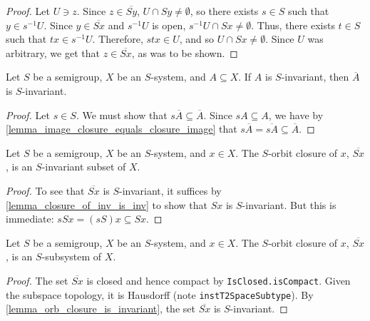 \begin{proof}
\leanok{}
    Let $U \ni z$.  Since $z \in \overline{Sy}$, $U \cap Sy \neq \emptyset$, so there exists $s \in S$ such that $y \in s^{-1}U$.  Since $y \in \overline{Sx}$ and $s^{-1}U$ is open, $s^{-1} U \cap Sx \neq \emptyset$.  Thus, there exists $t \in S$ such that $tx \in s^{-1} U$.  Therefore, $stx \in U$, and so $U \cap Sx \neq \emptyset$.  Since $U$ was arbitrary, we get that $z \in \overline{Sx}$, as was to be shown.
\end{proof}

\begin{lemma}
\label{lemma_closure_of_inv_is_inv}
\leanok{}
    Let $S$ be a semigroup, $X$ be an $S$-system, and $A \subseteq X$.  If $A$ is $S$-invariant, then $\overline{A}$ is $S$-invariant.
\end{lemma}

\begin{proof}
\leanok{}
    Let $s \in S$.  We must show that $s \overline{A} \subseteq \overline{A}$.  Since $s A \subseteq A$, we have by \cref{lemma_image_closure_equals_closure_image} that $s \overline{A} = \overline{sA} \subseteq \overline{A}$.
\end{proof}

\begin{lemma}
    \label{lemma_orb_closure_is_invariant}
    \leanok{}
    Let $S$ be a semigroup, $X$ be an $S$-system, and $x \in X$.  The $S$-orbit closure of $x$, $\overline{Sx}$, is an $S$-invariant subset of $X$.
\end{lemma}

\begin{proof}
\leanok{}
    To see that $\overline{Sx}$ is $S$-invariant, it suffices by \cref{lemma_closure_of_inv_is_inv} to show that $Sx$ is $S$-invariant.  But this is immediate: $sSx = (sS)x \subseteq Sx$.
\end{proof}

\begin{lemma}
    \label{lemma_orb_closure_is_subsystem}
    \leanok{}
    Let $S$ be a semigroup, $X$ be an $S$-system, and $x \in X$.  The $S$-orbit closure of $x$, $\overline{Sx}$, is an $S$-subsystem of $X$.
\end{lemma}

\begin{proof}
    \leanok{}
    The set $\overline{Sx}$ is closed and hence compact by \verb|IsClosed.isCompact|.  Given the subspace topology, it is Hausdorff (note \verb|instT2SpaceSubtype|). By \cref{lemma_orb_closure_is_invariant}, the set $\overline{Sx}$ is $S$-invariant.
\end{proof}

